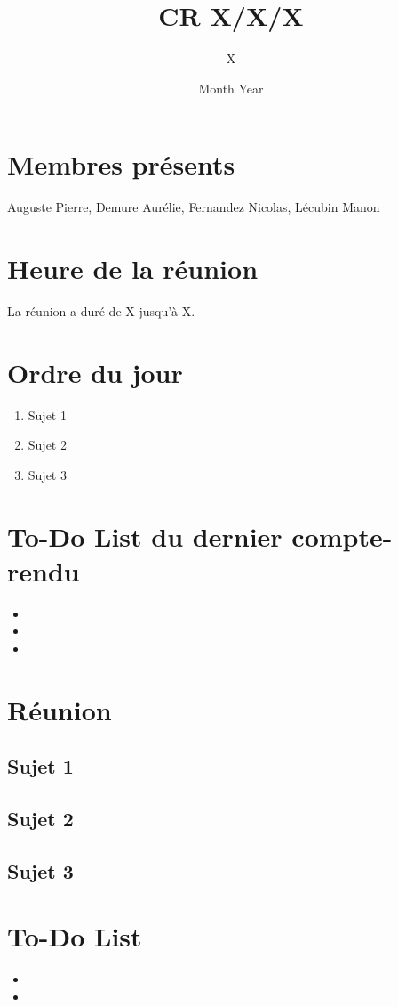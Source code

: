 \documentclass{report}
\title{CR X/X/X}
\author{X}
\date{Month Year}
\begin{document}
\maketitle


\maketitle

\section{Membres présents}
Auguste Pierre, Demure Aurélie, Fernandez Nicolas, Lécubin Manon

\section{Heure de la réunion}

La réunion a duré de X jusqu'à X.

\section{Ordre du jour}

\begin{enumerate}
    \item Sujet 1   
    \item Sujet 2
    \item Sujet 3
\end{enumerate}

\section{To-Do List du dernier compte-rendu}

\begin{itemize}
\item 
\item 
\item 
\end{itemize}

\section{Réunion}
\subsection{Sujet 1}



\subsection{Sujet 2}


\subsection{Sujet 3}


\section{To-Do List}

\begin{itemize}
    \item
    \item 

\end{itemize}
\end{document}
